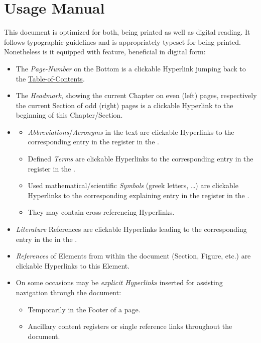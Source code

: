 \section{Usage Manual}

This document is optimized for both, being printed as well as digital reading.
It follows typographic guidelines and is appropriately typeset for being printed.
Nonetheless is it equipped with feature, beneficial in digital form:

\begin{itemize}
    \item
The \textit{Page-Number} on the Bottom is a clickable Hyperlink jumping back to the \hyperref[chapnt:ToC]{Table-of-Contents}.
    \item
The \textit{Headmark}, showing the current Chapter on even (left) pages, respectively the current Section of odd (right) pages is a clickable Hyperlink to the beginning of this Chapter/Section.
    \item
\hyperref[chap:Glossary]{}
    \begin{itemize}
        \item
    \textit{Abbreviations}/\textit{Acronyms} in the text are clickable Hyperlinks to the corresponding entry in the \hyperref[sec:Acronyms]{} register in the .
        \item
    Defined \textit{Terms} are clickable Hyperlinks to the corresponding entry in the \hyperref[sec:Glossaries]{} register in the .
        \item
    Used mathematical/scientific \textit{Symbols} (greek letters, \ldots) are clickable Hyperlinks to the corresponding explaining entry in the \hyperref[sec:Symbols]{} register in the .
        \item
    They may contain cross-referencing Hyperlinks.
    \end{itemize}
    \item
\textit{Literature} References are clickable Hyperlinks leading to the corresponding entry in the \hyperref[chap:literature]{} in the .
    \item
\textit{References} of Elements from within the document (Section, Figure, etc.) are clickable Hyperlinks to this Element.
    \item
On some occasions may be \textit{explicit Hyperlinks} inserted for assisting navigation through the document:
    \begin{itemize}
        \item
    Temporarily in the Footer of a page.
        \item
    Ancillary content registers or single reference links throughout the document.
    \end{itemize}
\end{itemize}